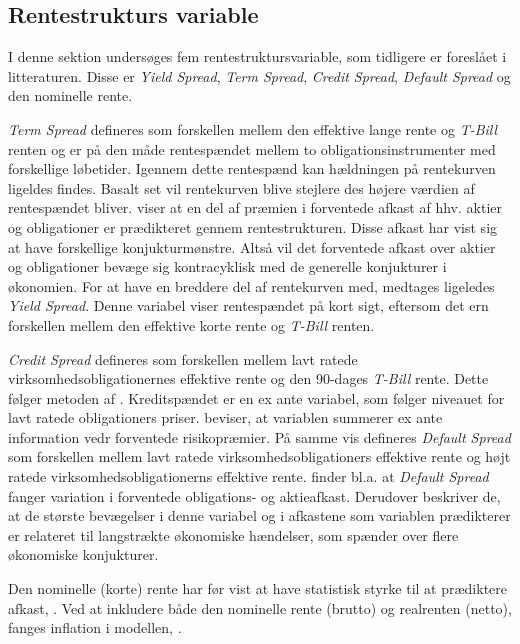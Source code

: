\documentclass[
  a4paper,
  oneside]{memoir}
\begin{document}
\hypertarget{rentestrukturs-variable}{%
\subsection{Rentestrukturs variable}\label{rentestrukturs-variable}}

I denne sektion undersøges fem rentestruktursvariable, som tidligere er foreslået i litteraturen. Disse er \emph{Yield Spread}, \emph{Term Spread}, \emph{Credit Spread}, \emph{Default Spread} og den nominelle rente.

\emph{Term Spread} defineres som forskellen mellem den effektive lange rente og \emph{T-Bill} renten og er på den måde rentespændet mellem to obligationsinstrumenter med forskellige løbetider. Igennem dette rentespænd kan hældningen på rentekurven ligeldes findes. Basalt set vil rentekurven blive stejlere des højere værdien af rentespændet bliver. \citep{Fama1989} viser at en del af præmien i forventede afkast af hhv. aktier og obligationer er prædikteret gennem rentestrukturen. Disse afkast har vist sig at have forskellige konjukturmønstre. Altså vil det forventede afkast over aktier og obligationer bevæge sig kontracyklisk med de generelle konjukturer i økonomien. For at have en breddere del af rentekurven med, medtages ligeledes \emph{Yield Spread}. Denne variabel viser rentespændet på kort sigt, eftersom det ern forskellen mellem den effektive korte rente og \emph{T-Bill} renten.

\emph{Credit Spread} defineres som forskellen mellem lavt ratede virksomhedsobligationernes effektive rente og den 90-dages \emph{T-Bill} rente. Dette følger metoden af \citep{Keim1986}. Kreditspændet er en ex ante variabel, som følger niveauet for lavt ratede obligationers priser. \citep{Keim1986} beviser, at variablen summerer ex ante information vedr forventede risikopræmier. På samme vis defineres \emph{Default Spread} som forskellen mellem lavt ratede virksomhedsobligationers effektive rente og højt ratede virksomhedsobligationerns effektive rente. \citep{Fama1989} finder bl.a. at \emph{Default Spread} fanger variation i forventede obligations- og aktieafkast. Derudover beskriver de, at de største bevægelser i denne variabel og i afkastene som variablen prædikterer er relateret til langstrækte økonomiske hændelser, som spænder over flere økonomiske konjukturer.

Den nominelle (korte) rente har før vist at have statistisk styrke til at prædiktere afkast, \citep{Campbell2005}. Ved at inkludere både den nominelle rente (brutto) og realrenten (netto), fanges inflation i modellen, \citep{Campbell2005}.
\end{document}
